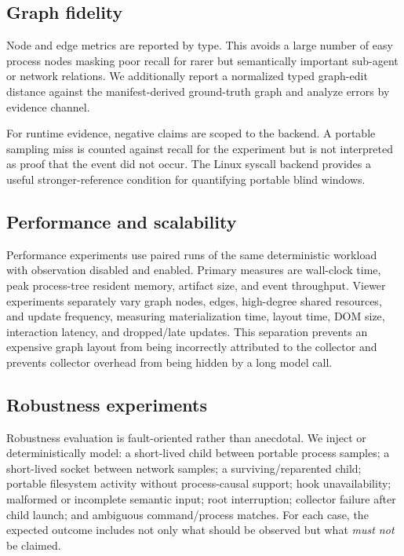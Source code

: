 \subsection{Graph fidelity}
Node and edge metrics are reported by type. This avoids a large number of easy process nodes masking poor recall for rarer but semantically important sub-agent or network relations. We additionally report a normalized typed graph-edit distance against the manifest-derived ground-truth graph and analyze errors by evidence channel.

For runtime evidence, negative claims are scoped to the backend. A portable sampling miss is counted against recall for the experiment but is not interpreted as proof that the event did not occur. The Linux syscall backend provides a useful stronger-reference condition for quantifying portable blind windows.

\subsection{Performance and scalability}
Performance experiments use paired runs of the same deterministic workload with observation disabled and enabled. Primary measures are wall-clock time, peak process-tree resident memory, artifact size, and event throughput. Viewer experiments separately vary graph nodes, edges, high-degree shared resources, and update frequency, measuring materialization time, layout time, DOM size, interaction latency, and dropped/late updates. This separation prevents an expensive graph layout from being incorrectly attributed to the collector and prevents collector overhead from being hidden by a long model call.

\subsection{Robustness experiments}
Robustness evaluation is fault-oriented rather than anecdotal. We inject or deterministically model: a short-lived child between portable process samples; a short-lived socket between network samples; a surviving/reparented child; portable filesystem activity without process-causal support; hook unavailability; malformed or incomplete semantic input; root interruption; collector failure after child launch; and ambiguous command/process matches. For each case, the expected outcome includes not only what should be observed but what \emph{must not} be claimed.

